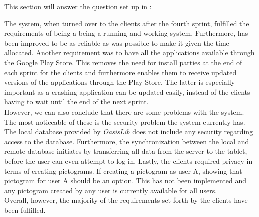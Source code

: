 This section will answer the question set up in :


The system, when turned over to the clients after the fourth sprint, fulfilled the requirements of being a being a running and working system.
Furthermore, \launcher has been improved to be as reliable as was possible to make it given the time allocated.
Another requirement was to have all the \giraf applications available through the Google Play Store.
This removes the need for install parties at the end of each sprint for the clients and furthermore enables them to receive updated versions of the applications through the Play Store. 
The latter is especially important as a crashing application can be updated easily, instead of the clients having to wait until the end of the next sprint.\\

However, we can also conclude that there are some problems with the \giraf system.
The most noticeable of these is the security problem the \giraf system currently has.
The local database provided by \textit{OasisLib} does not include any security regarding access to the database.
Furthermore, the synchronization between the local and remote database initiates by transferring all data from the server to the tablet, before the user can even attempt to log in.
Lastly, the clients required privacy in terms of creating pictograms.
If creating a pictogram as user A, showing that pictogram for user A should be an option.
This has not been implemented and any pictogram created by any user is currently available for all users.\\

Overall, however, the majority of the requirements set forth by the clients have been fulfilled.